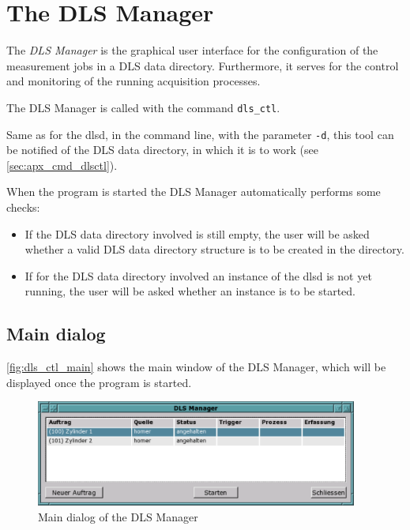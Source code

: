 \documentclass[a4paper,12pt,BCOR6mm,bibtotoc,idxtotoc]{scrbook}
\begin{document}

\chapter{The DLS Manager}
\label{sec:manager}

The \textit{DLS Manager} is the graphical user interface for the configuration of the measurement jobs in a DLS data directory. Furthermore, it serves for the control and monitoring of the running acquisition processes.

The DLS Manager is called with the command \texttt{dls\_ctl}.

Same as for the dlsd, in the command line, with the parameter \texttt{-d},
this tool can be notified of the DLS data directory, in which it is to work
(see \autoref{sec:apx_cmd_dlsctl}).

When the program is started the DLS Manager automatically performs some checks:

\begin{itemize}
\item If the DLS data directory involved is still empty, the user will be asked whether a valid DLS data directory structure is to be created in the directory.
\item If for the DLS data directory involved an instance of the dlsd is not yet running, the user will be asked whether an instance is to be started. \end{itemize}


\section{Main dialog}

\autoref{fig:dls_ctl_main} shows the main window of the DLS Manager, which
will be displayed once the program is started.

\begin{figure}[tbh] \begin{center} \includegraphics[width=300pt]{bilder/ctl_main} \end{center} \caption{Main dialog of the DLS Manager} \label{fig:dls_ctl_main} \end{figure}
\end{document}
